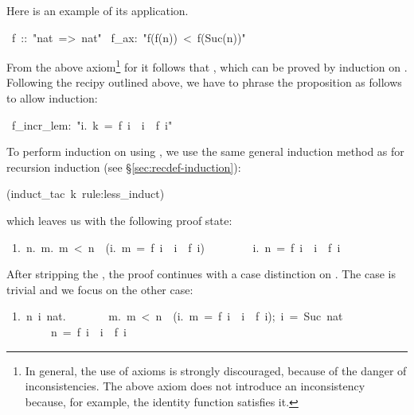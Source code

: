 \begin{isabelle}
\begin{isamarkuptext}
\begin{quote}
\end{quote}
Here is an example of its application.%
\end{isamarkuptext}%
\ f\ ::\ {"}nat\ =>\ nat{"}\isanewline
{}\ f\_ax:\ {"}f(f(n))\ <\ f(Suc(n)){"}%
\begin{isamarkuptext}%
\noindent
From the above axiom\footnote{In general, the use of axioms is strongly
discouraged, because of the danger of inconsistencies. The above axiom does
not introduce an inconsistency because, for example, the identity function
satisfies it.}
for  it follows that , which can
be proved by induction on . Following the recipy outlined
above, we have to phrase the proposition as follows to allow induction:%
\end{isamarkuptext}%
\ f\_incr\_lem:\ {"}{\isasymforall}i.\ k\ =\ f\ i\ {\isasymlongrightarrow}\ i\ {\isasymle}\ f\ i{"}%
\begin{isamarkuptxt}%
\noindent
To perform induction on  using , we use the same
general induction method as for recursion induction (see
\S\ref{sec:recdef-induction}):%
\end{isamarkuptxt}%
(induct\_tac\ k\ rule:less\_induct)%
\begin{isamarkuptxt}%
\noindent
which leaves us with the following proof state:
\begin{isabellepar}%
\ 1.\ {\isasymAnd}\mbox{n}.\ {\isasymforall}\mbox{m}.\ \mbox{m}\ <\ \mbox{n}\ {\isasymlongrightarrow}\ ({\isasymforall}\mbox{i}.\ \mbox{m}\ =\ f\ \mbox{i}\ {\isasymlongrightarrow}\ \mbox{i}\ {\isasymle}\ f\ \mbox{i})\isanewline
\ \ \ \ \ \ \ {\isasymLongrightarrow}\ {\isasymforall}\mbox{i}.\ \mbox{n}\ =\ f\ \mbox{i}\ {\isasymlongrightarrow}\ \mbox{i}\ {\isasymle}\ f\ \mbox{i}
\end{isabellepar}%
After stripping the , the proof continues with a case
distinction on . The case  is trivial and we focus on the
other case:
\begin{isabellepar}%
\ 1.\ {\isasymAnd}\mbox{n}\ \mbox{i}\ \mbox{nat}.\isanewline
\ \ \ \ \ \ \ {\isasymlbrakk}{\isasymforall}\mbox{m}.\ \mbox{m}\ <\ \mbox{n}\ {\isasymlongrightarrow}\ ({\isasymforall}\mbox{i}.\ \mbox{m}\ =\ f\ \mbox{i}\ {\isasymlongrightarrow}\ \mbox{i}\ {\isasymle}\ f\ \mbox{i});\ \mbox{i}\ =\ Suc\ \mbox{nat}{\isasymrbrakk}\isanewline
\ \ \ \ \ \ \ {\isasymLongrightarrow}\ \mbox{n}\ =\ f\ \mbox{i}\ {\isasymlongrightarrow}\ \mbox{i}\ {\isasymle}\ f\ \mbox{i}

\end{isabellepar}
\end{isamarkuptxt}
\end{isabelle}
